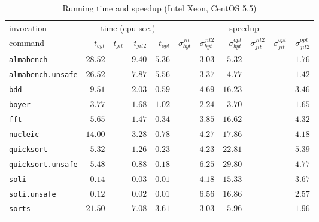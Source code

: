 \documentclass[12pt,a4paper,final]{article}
\begin{document}
\begin{table*}[p]
  \footnotesize
  \centering
  \begin{tabular}{l|rrrr|rrrrrr}
    \multicolumn{1}{l|}{\large invocation}
    & \multicolumn{4}{c|}{{\large time} (cpu sec.)}
    & \multicolumn{6}{c}{\large speedup}
    \\
    command
    & $t_{byt}$ & $t_{jit}$ & $t_{jit2}$ & $t_{opt}$
    & $\sigma^{jit}_{byt}$ & $\sigma^{jit2}_{byt}$ & $\sigma^{opt}_{byt}$
    & $\sigma^{jit2}_{jit}$ & $\sigma^{opt}_{jit}$ & $\sigma^{opt}_{jit2}$
    \\
    \hline
    \texttt{almabench} & $28.52$ &  & $9.40$ & $5.36$ &  & $3.03$ & $5.32$ &  &  & $1.76$\\
    \texttt{almabench.unsafe} & $26.52$ &  & $7.87$ & $5.56$ &  & $3.37$ & $4.77$ &  &  & $1.42$\\
    \texttt{bdd} & $9.51$ &  & $2.03$ & $0.59$ &  & $4.69$ & $16.23$ &  &  & $3.46$\\
    \texttt{boyer} & $3.77$ &  & $1.68$ & $1.02$ &  & $2.24$ & $3.70$ &  &  & $1.65$\\
    \texttt{fft} & $5.65$ &  & $1.47$ & $0.34$ &  & $3.85$ & $16.62$ &  &  & $4.32$\\
    \texttt{nucleic} & $14.00$ &  & $3.28$ & $0.78$ &  & $4.27$ & $17.86$ &  &  & $4.18$\\
    \texttt{quicksort} & $5.32$ &  & $1.26$ & $0.23$ &  & $4.23$ & $22.81$ &  &  & $5.39$\\
    \texttt{quicksort.unsafe} & $5.48$ &  & $0.88$ & $0.18$ &  & $6.25$ & $29.80$ &  &  & $4.77$\\
    \texttt{soli} & $0.14$ &  & $0.03$ & $0.01$ &  & $4.18$ & $15.33$ &  &  & $3.67$\\
    \texttt{soli.unsafe} & $0.12$ &  & $0.02$ & $0.01$ &  & $6.56$ & $16.86$ &  &  & $2.57$\\
    \texttt{sorts} & $21.50$ &  & $7.08$ & $3.61$ &  & $3.03$ & $5.96$ &  &  & $1.96$\\
  \end{tabular}
  \caption{Running time and speedup (Intel Xeon, CentOS 5.5)}
  \label{table:Running_time_and_speedup_Intel_Xeon}
\end{table*}
\end{document}
